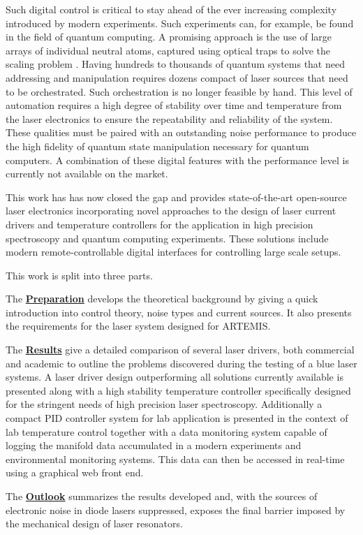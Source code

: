 Such digital control is critical to stay ahead of the ever increasing complexity introduced by modern experiments. Such experiments can, for example, be found in the field of quantum computing. A promising approach is the use of large arrays of individual neutral atoms, captured using optical traps to solve the scaling problem \cite{quatum_computer_scaling_ions}. Having hundreds to thousands of quantum systems that need addressing and manipulation requires dozens compact of laser sources that need to be orchestrated. Such orchestration is no longer feasible by hand. This level of automation requires a high degree of stability over time and temperature from the laser electronics to ensure the repeatability and reliability of the system. These qualities must be paired with an outstanding noise performance to produce the high fidelity of quantum state manipulation necessary for quantum computers. A combination of these digital features with the performance level is currently not available on the market.

This work has has now closed the gap and provides state-of-the-art open-source laser electronics incorporating novel approaches to the design of laser current drivers and temperature controllers for the application in high precision spectroscopy and quantum computing experiments. These solutions include modern remote-controllable digital interfaces for controlling large scale setups.

This work is split into three parts. \par\vspace{12pt}

The \hyperref[sec:preparation]{\textbf{Preparation}} develops the theoretical background by giving a quick introduction into control theory, noise types and current sources. It also presents the requirements for the laser system designed for ARTEMIS.\par\vspace{12pt}

The \hyperref[sec:results]{\textbf{Results}} give a detailed comparison of several laser drivers, both commercial and academic to outline the problems discovered during the testing of a blue laser systems. A laser driver design outperforming all solutions currently available is presented along with a high stability temperature controller specifically designed for the stringent needs of high precision laser spectroscopy. Additionally a compact PID controller system for lab application is presented in the context of lab temperature control together with a data monitoring system capable of logging the manifold data accumulated in a modern experiments and environmental monitoring systems. This data can then be accessed in real-time using a graphical web front end. \par\vspace{12pt}

The \hyperref[sec:outlook]{\textbf{Outlook}} summarizes the results developed and, with the sources of electronic noise in diode lasers suppressed, exposes the final barrier imposed by the mechanical design of laser resonators.
